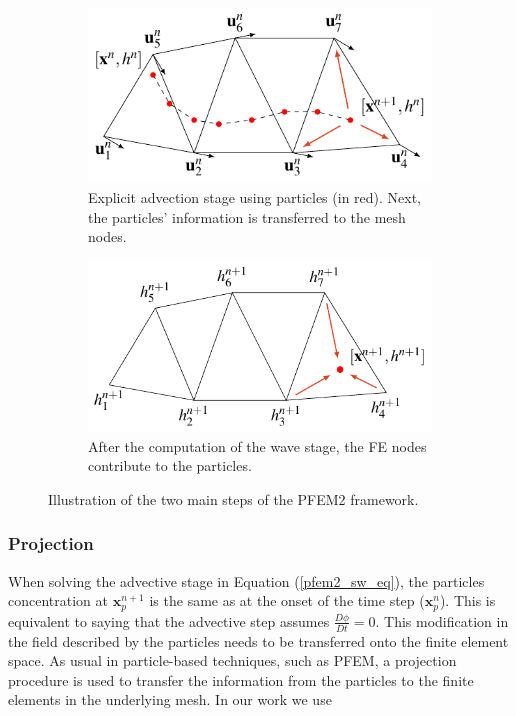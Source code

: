 \begin{figure} [htb]
\begin{subfigure}{0.48\textwidth}
    \centering
    \includegraphics[width=\textwidth]{img/lagrangian/pfem2_convection_stage.pdf}
    \caption{Explicit advection stage using particles (in red). Next, the particles' information is transferred to the mesh nodes.}
    \label{pfem2_convection_stage}
\end{subfigure}
\hfill
\begin{subfigure}{0.48\textwidth}
    \centering
    \includegraphics[width=\textwidth]{img/lagrangian/pfem2_wave_stage.pdf}
    \caption{After the computation of the wave stage, the FE nodes contribute to the particles.}
    \label{pfem2_wave_stage}
\end{subfigure}
\caption{Illustration of the two main steps of the PFEM2 framework.}
\label{pfem2_diffusion_and_wave_stages}
\end{figure}



\subsubsection{Projection}


When solving the advective stage in Equation (\ref{pfem2_sw_eq}), the particles concentration at $\mathbf x_p^{n+1}$ is the same as at the onset of the time step ($\mathbf x_p^n$). This is equivalent to saying that the advective step assumes $\frac{D\phi}{D t}=0$. This modification in the field described by the particles needs to be transferred onto the finite element space. As usual in particle-based techniques, such as PFEM, a projection procedure is used to transfer the information from the particles to the finite elements in the underlying mesh. In our work we use

